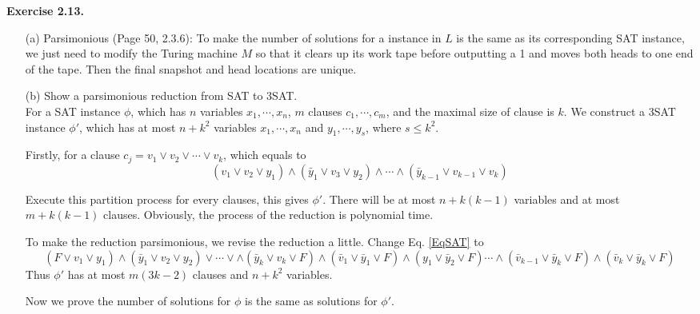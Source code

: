 \documentclass[a4paper]{article}
\newenvironment{exercise}[1]{
	\par
	\noindent\textbf{Exercise #1.}\quad
}{
	\par
	\bigskip
}
\begin{document}
    \begin{exercise}{2.13}
	\begin{itemize}
\item [(a)]
Parsimonious (Page 50, 2.3.6): 
To make the number of solutions for a instance in $L$ is the same as its corresponding SAT instance, we just need to modify the Turing machine $M$ so that it clears up its work tape before outputting a 1 and moves both heads to one end of the tape. Then the final snapshot and head locations are unique. 
\item[(b)]Show a parsimonious reduction from SAT to 3SAT.\\
For a SAT instance $\phi$, which has $n$ variables $x_{1}, \cdots, x_{n}$, $m$ clauses $c_{1},\cdots, c_{m}$, and the maximal size of clause is $k$. We construct a 3SAT instance $\phi'$, which has at most $n + k^{2}$ variables $x_{1},\cdots, x_{n}$ and $y_{1},\cdots , y_{s}$, where $s\leq k^{2}$.

Firstly, for a clause $c_{j} = v_{1} \vee v_{2} \vee \cdots \vee v_{k}$, which equals to 
\begin{equation}(v_{1} \vee v_{2} \vee y_{1} )\wedge (\bar{y}_{1} \vee v_{3} \vee y_{2})
\wedge \cdots \wedge(\bar{y}_{k-1}\vee v_{k - 1} \vee v_{k})
\label{EqSAT}\end{equation}

Execute this partition process for every clauses, this gives $\phi'$. There will be at most  $n + k(k - 1)$ variables and at most $m + k(k - 1)$ clauses. Obviously, the process of the reduction is polynomial time.

To make the reduction parsimonious, we revise the reduction a little.
Change Eq. \ref{EqSAT} to
\begin{equation}
(F \vee v_{1} \vee y_{1} )\wedge (\bar{y}_{1} \vee v_{2} \vee y_{2})\vee \cdots \vee
\wedge (\bar{y}_{k}\vee v_{k} \vee F) \wedge (\bar{v}_{1} \vee \bar{y}_{1} \vee F) \wedge ( y_{1} \vee \bar{y}_{2}\vee F) \cdots \wedge (\bar{v}_{k-1} \vee \bar{y}_{k} \vee F)\wedge 
(  \bar{v}_{k}\vee \bar{y}_{k}\vee F)
\label{EqSAT1}\end{equation}
Thus $\phi'$ has at most $m(3k - 2)$ clauses and $n + k^{2}$ variables.

Now we prove the number of solutions for $\phi$ is the same as solutions for $\phi'$.


\end{itemize}
\end{exercise}
\end{document}
